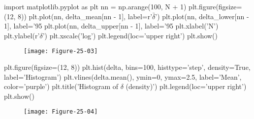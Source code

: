 \begin{python}
import matplotlib.pyplot as plt
nn = np.arange(100, N + 1)
plt.figure(figsize=(12, 8))
plt.plot(nn, delta_mean[nn - 1], label=r'$\bar{\delta}$')
plt.plot(nn, delta_lower[nn - 1], label='95%
plt.plot(nn, delta_upper[nn - 1], label='95%
plt.xlabel('N')
plt.ylabel(r'$\delta$')
plt.xscale('log')
plt.legend(loc='upper right')
plt.show()
\end{python}

\begin{figure}[H]
\centering
\texttt{[image: Figure-25-03]}
\end{figure}


\begin{python}
plt.figure(figsize=(12, 8))
plt.hist(delta, bins=100, histtype='step', density=True, label='Histogram')
plt.vlines(delta.mean(), ymin=0, ymax=2.5, label='Mean', color='purple')
plt.title('Histogram of $\delta$ (density)')
plt.legend(loc='upper right')
plt.show()
\end{python}

\begin{figure}[H]
\centering
\texttt{[image: Figure-25-04]}
\end{figure}

